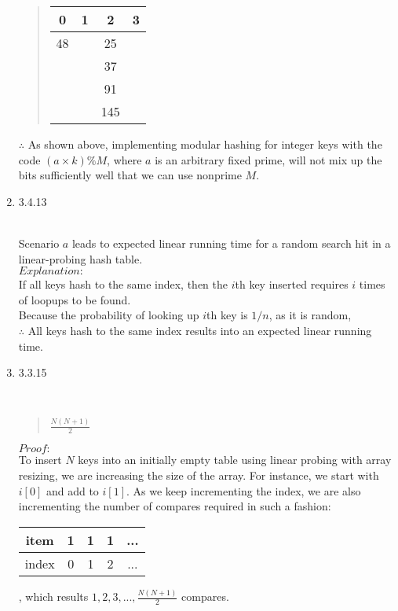 \documentclass[11pt]{article}
\begin{document}
\begin{enumerate}
\begin{solution}
\begin{quote}
\begin{tabular}{cccc}
0&1&2&3\\
\hline
48&&25&\\
&&37&\\
&&91&\\
&&145&\\
\end{tabular}
\end{quote}

$\therefore$ As shown above, implementing modular hashing for integer keys with the code $(a \times k) \% M$, where $a$ is an arbitrary fixed prime, will not mix up the bits sufficiently well that we can use nonprime $M$.
\end{solution}


\item 3.4.13

\begin{solution}\\
Scenario $a$ leads to expected linear running time for a random search hit in a linear-probing hash table.\\
$Explanation:$\\
If all keys hash to the same index, then the $i$th key inserted requires $i$ times of loopups to be found.\\
Because the probability of looking up $i$th key is $1/n$, as it is random,\\
$\therefore$ All keys hash to the same index results into an expected linear running time. 
\end{solution}


\item 3.3.15

\begin{solution}\\
\begin{quote}
$\frac{N(N+1)}{2}$
\end{quote}
\end{solution}

$Proof:$\\
To insert $N$ keys into an initially empty table using linear probing with array resizing, we are increasing the size of the array. For instance, we start with $i[0]$ and add to $i[1]$. As we keep incrementing the index, we are also incrementing the number of compares required in such a fashion:\\
\begin{tabular}{c|c|c|c|c|}
item&1&1&1&...\\
\hline
index&0&1&2&...\\
\end{tabular}, 
which results $1, 2, 3, ..., \frac{N(N+1)}{2}$ compares.


\end{enumerate}
\end{document}
